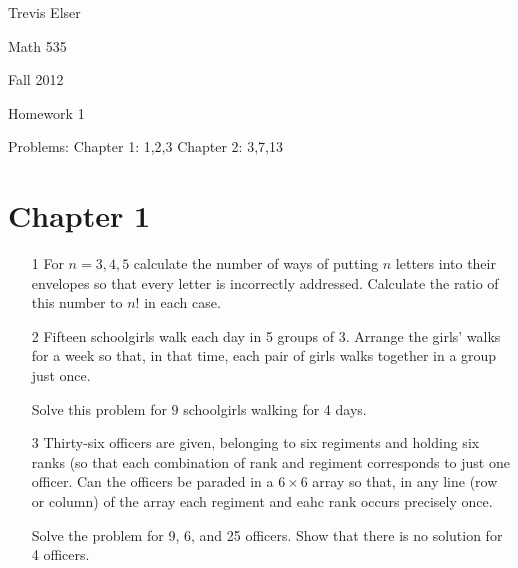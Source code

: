 \documentclass[12pt]{article}
\author{Trevis Elser \\
\small \texttt{telser@emory.edu} \\ \\
}
\begin{document}
\hfill Trevis Elser

\hfill Math 535
 
\hfill Fall 2012

\hfill Homework 1

\hfill Problems: Chapter 1: 1,2,3 Chapter 2: 3,7,13

\section{Chapter 1}

\begin{enumerate}

\item[1] For $n = 3,4,5$ calculate the number of ways of putting $n$ letters into their envelopes so that every letter is incorrectly addressed. Calculate the ratio of this number to $n!$ in each case.

\item[2] Fifteen schoolgirls walk each day in 5 groups of 3. Arrange the girls' walks for a week so that, in that time, each pair of girls walks together in a group just once. 

Solve this problem for $9$ schoolgirls walking for 4 days. 

\item[3]Thirty-six officers are given, belonging to six regiments and holding six ranks (so that each combination of rank and regiment corresponds to just one officer. Can the officers be paraded in a $6 \times 6$ array so that, in any line (row or column) of the array each regiment and eahc rank occurs precisely once.

Solve the problem for 9, 6, and 25 officers. Show that there is no solution for 4 officers. 

\end{enumerate}
\end{document}
